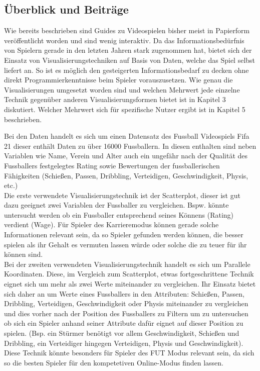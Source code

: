\documentclass[usegeometry=true]{scrartcl}
\begin{document}
\subsection{Überblick und Beiträge}

Wie bereits beschrieben sind Guides zu Videospielen bisher meist in Papierform veröffentlicht worden und sind wenig interaktiv. Da das Informationsbedürfnis von Spielern gerade in den letzten Jahren stark zugenommen hat, bietet sich der Einsatz von Visualisierungstechniken auf Basis von Daten, welche das Spiel selbst liefert an. So ist es möglich den gesteigerten Informationsbedarf zu decken ohne direkt Programmierkenntnisse beim Spieler vorauszusetzen.
Wie genau die Visualisierungen umgesetzt worden sind und welchen Mehrwert jede einzelne Technik gegenüber anderen Visualisierungsformen bietet ist in Kapitel 3 diskutiert. Welcher Mehrwert sich für spezifische Nutzer ergibt ist in Kapitel 5 beschrieben.

\iffalse

Bei den Daten handelt es sich um einen Datensatz des Fussball Videospiels Fifa 21 dieser enthält Daten zu über 16000 Fussballern. In diesen enthalten sind neben Variablen wie Name, Verein und Alter auch ein ungefähr nach der Qualität des Fussballers festgelegtes Rating sowie Bewertungen der fussballerischen Fähigkeiten (Schießen, Passen, Dribbling, Verteidigen, Geschwindigkeit, Physis, etc.)\\

Die erste verwendete Visualisierungstechnik ist der Scatterplot, dieser ist gut dazu geeignet zwei Variablen der Fussballer zu vergleichen. Bspw. könnte untersucht werden ob ein Fussballer entsprechend seines Könnens (Rating) verdient (Wage). Für Spieler des Karrieremodus können gerade solche Informationen relevant sein, da so Spieler gefunden werden können, die besser spielen als ihr Gehalt es vermuten lassen würde oder solche die zu teuer für ihr können sind.\\

Bei der zweiten verwendeten Visualisierungstechnik handelt es sich um Parallele Koordinaten. Diese, im Vergleich zum Scatterplot, etwas fortgeschrittene Technik eignet sich um mehr als zwei Werte miteinander zu vergleichen. Ihr Einsatz bietet sich daher an um Werte eines Fussballers in den Attributen: Schießen, Passen, Dribbling, Verteidigen, Geschwindigkeit oder Physis miteinander zu vergleichen und dies vorher nach der Position des Fussballers zu Filtern um zu untersuchen ob sich ein Spieler anhand seiner Attribute dafür eignet auf dieser Position zu spielen. (Bsp. ein Stürmer benötigt vor allem Geschwindigkeit, Schießen und Dribbling, ein Verteidiger hingegen Verteidigen, Physis und Geschwindigkeit).
Diese Technik könnte besonders für Spieler des FUT Modus relevant sein, da sich so die besten Spieler für den kompetetiven Online-Modus finden lassen.\\
\end{document}
